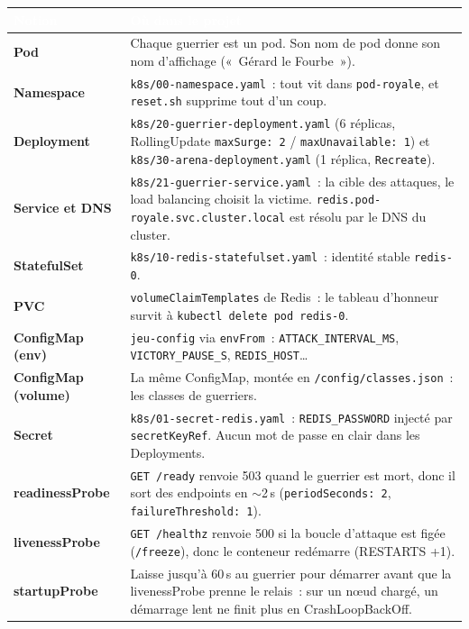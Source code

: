 \documentclass[11pt,a4paper]{article}
\newcommand{\code}[1]{\texttt{#1}}
\newcommand{\entete}[1]{\textcolor{white}{\sffamily\bfseries #1}}
\begin{document}
\begin{longtable}{L{3.5cm} L{12.0cm}}
\entete{Notion} & \entete{Où dans le projet}\\
\endhead
{}\textbf{Pod} & Chaque guerrier est un pod. Son nom de pod donne
  son nom d'affichage («~Gérard le Fourbe~»).\\
\textbf{Namespace} & \code{k8s/00-namespace.yaml}~: tout vit dans
  \code{pod-royale}, et \code{reset.sh} supprime tout d'un coup.\\
\textbf{Deployment} & \code{k8s/20-guerrier-deployment.yaml}
  (6 réplicas, RollingUpdate \code{maxSurge: 2} / \code{maxUnavailable: 1}) et
  \code{k8s/30-arena-deployment.yaml} (1 réplica, \code{Recreate}).\\
\textbf{Service et DNS} & \code{k8s/21-guerrier-service.yaml}~: la cible des
  attaques, le load balancing choisit la victime.
  \code{redis.pod-royale.svc.cluster.local} est résolu par le DNS du cluster.\\
\textbf{StatefulSet} & \code{k8s/10-redis-statefulset.yaml}~:
  identité stable \code{redis-0}.\\
\textbf{PVC} & \code{volumeClaimTemplates} de Redis~: le tableau d'honneur
  survit à \code{kubectl delete pod redis-0}.\\
\textbf{ConfigMap (env)} & \code{jeu-config} via
  \code{envFrom}~: \code{ATTACK\_INTERVAL\_MS}, \code{VICTORY\_PAUSE\_S},
  \code{REDIS\_HOST}…\\
\textbf{ConfigMap (volume)} & La même ConfigMap, montée en
  \code{/config/classes.json}~: les classes de guerriers.\\
\textbf{Secret} & \code{k8s/01-secret-redis.yaml}~:
  \code{REDIS\_PASSWORD} injecté par \code{secretKeyRef}. Aucun mot de passe en
  clair dans les Deployments.\\
\textbf{readinessProbe} & \code{GET /ready} renvoie 503 quand le guerrier est
  mort, donc il sort des endpoints en $\sim$2\,s (\code{periodSeconds: 2},
  \code{failureThreshold: 1}).\\
\textbf{livenessProbe} & \code{GET /healthz} renvoie 500 si la
  boucle d'attaque est figée (\code{/freeze}), donc le conteneur redémarre
  (RESTARTS +1).\\
\textbf{startupProbe} & Laisse jusqu'à 60\,s au guerrier pour démarrer avant que
  la livenessProbe prenne le relais~: sur un nœud chargé, un démarrage lent ne
  finit plus en CrashLoopBackOff.\\

\end{longtable}
\end{document}
